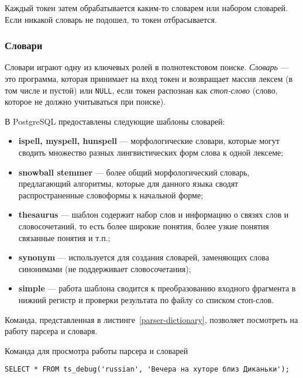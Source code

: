 \noindent Каждый токен затем обрабатывается каким-то словарем или набором словарей.
Если никакой словарь не подошел, то токен отбрасывается.

\subsubsection{Словари}

Словари играют одну из ключевых ролей в полнотекстовом поиске.
\textit{Словарь} --- это программа, которая принимает на вход токен и возвращает массив лексем (в том числе и пустой) или \texttt{NULL}, если токен распознан как \textit{стоп-слово} (слово, которое не должно учитываться при поиске).

\noindent В PostgreSQL предоставлены следующие шаблоны словарей:
\begin{itemize}
    \item{\textbf{ispell, myspell, hunspell}} --- морфологические словари, которые могут сводить множество разных лингвистических форм слова к одной лексеме;
    \item{\textbf{snowball stemmer}} --- более общий морфологический словарь, предлагающий алгоритмы, которые для данного языка сводят распространенные словоформы к начальной форме;
    \item{\textbf{thesaurus}} --- шаблон содержит набор слов и информацию о связях слов и словосочетаний, то есть более широкие понятия, более узкие понятия связанные понятия и т.п.;
    \item{\textbf{synonym}} --- используется для создания словарей, заменяющих слова синонимами (не поддерживает словосочетания);
    \item{\textbf{simple}} --- работа шаблона сводится к преобразованию входного фрагмента в нижний регистр и проверки результата по файлу со списком стоп-слов.
\end{itemize}

\noindent Команда, представленная в листинге~\ref{parser-dictionary}, позволяет посмотреть на работу парсера и словаря.

\begin{algorithm}
    \caption{Команда для просмотра работы парсера и словарей}
    \label{parser-dictionary}
    \begin{lstlisting}[style=codelistingstyle]
    SELECT * FROM ts_debug('russian', 'Вечера на хуторе близ Диканьки');
    \end{lstlisting}
\end{algorithm}

